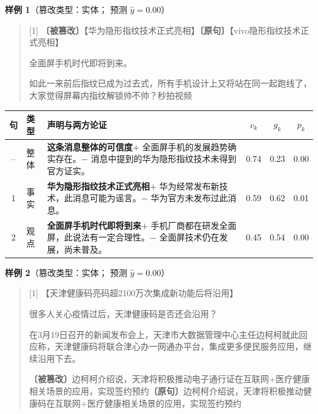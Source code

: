 \noindent\textbf{样例 1}（篡改类型：实体；\method{} 预测 $\hat y=0.00$）\par
{\small\begin{quote}
[1] \textbf{〔被篡改〕}【华为隐形指纹技术正式亮相】\quad\textbf{〔原句〕}【vivo隐形指纹技术正式亮相】\par
[2] 全面屏手机时代即将到来。\par
[3] 如此一来前后指纹已成为过去式，所有手机设计上又将站在同一起跑线了，大家觉得屏幕内指纹解锁帅不帅？秒拍视频\par
\end{quote}}
{\small\begin{tabularx}{\linewidth}{@{}clXccc@{}}
\toprule
句 & 类型 & 声明与两方论证 & $v_k$ & $g_k$ & $p_k$ \\
\midrule
-- & 整体 & \textbf{这条消息整体的可信度}\newline $+$ 全面屏手机的发展趋势确实存在。\newline $-$ 消息中提到的华为隐形指纹技术未得到官方证实。 & 0.74 & 0.23 & 0.00 \\
1 & 事实 & \textbf{华为隐形指纹技术正式亮相}\newline $+$ 华为经常发布新技术，此消息可能为谣言。\newline $-$ 华为官方未发布过此消息。 & 0.59 & 0.62 & 0.01 \\
2 & 观点 & \textbf{全面屏手机时代即将到来}\newline $+$ 手机厂商都在研发全面屏，此说法有一定合理性。\newline $-$ 全面屏技术仍在发展，尚未普及。 & 0.45 & 0.54 & 0.00 \\
\bottomrule
\end{tabularx}}
\par\medskip
\noindent\textbf{样例 2}（篡改类型：实体；\method{} 预测 $\hat y=0.00$）\par
{\small\begin{quote}
[1] 【天津健康码亮码超2100万次集成新功能后将沿用】\par
[2] 很多人关心疫情过后，天津健康码是否还会沿用？\par
[3] 在3月19日召开的新闻发布会上，天津市大数据管理中心主任边柯柯就此回应称，天津健康码将联合津心办一网通办平台，集成更多便民服务应用，继续沿用下去。\par
[4] \textbf{〔被篡改〕}边柯柯介绍说，天津将积极推动电子通行证在互联网+医疗健康相关场景的应用，实现签约预约\quad\textbf{〔原句〕}边柯柯介绍说，天津将积极推动健康码在互联网+医疗健康相关场景的应用，实现签约预约\par
\end{quote}}
